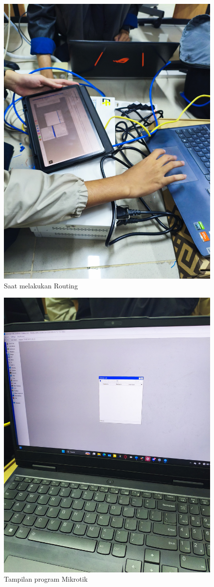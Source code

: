 \begin{figure}[H]
    \centering
    \includegraphics[width=0.5\linewidth]{P1/img/5.jpeg}
    \caption{Saat melakukan Routing}
    \label{fig:inirujukan}
  \end{figure}

  \begin{figure}[H]
    \centering
    \includegraphics[width=0.5\linewidth]{P1/img/6.jpeg}
    \caption{Tampilan program Mikrotik}
    \label{fig:inirujukan}
  \end{figure}